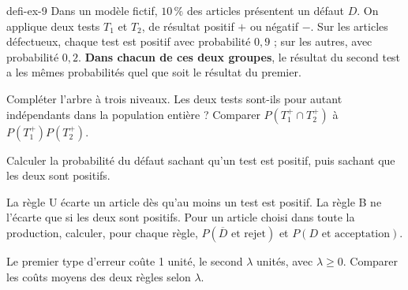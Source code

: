 \begin{blocEdition}{defi-ex-9}
Dans un modèle fictif, $10\,\%$ des articles présentent un défaut $D$.
On applique deux tests $T_1$ et $T_2$, de résultat positif $+$ ou négatif $-$.
Sur les articles défectueux, chaque test est positif avec probabilité $0{,}9$ ;
sur les autres, avec probabilité $0{,}2$.
\textbf{Dans chacun de ces deux groupes}, le résultat du second test a les mêmes
probabilités quel que soit le résultat du premier.
\begin{questions}
\item Compléter l'arbre à trois niveaux. Les deux tests sont-ils pour autant
indépendants dans la population entière ? Comparer $P(T_1^+\cap T_2^+)$ à $P(T_1^+)P(T_2^+)$.
\item Calculer la probabilité du défaut sachant qu'un test est positif,
puis sachant que les deux sont positifs.
\item La règle U écarte un article dès qu'au moins un test est positif.
La règle B ne l'écarte que si les deux sont positifs. Pour un article choisi dans toute la production,
calculer, pour chaque règle, $P(\overline D\text{ et rejet})$ et $P(D\text{ et acceptation})$.
\item Le premier type d'erreur coûte 1 unité, le second $\lambda$ unités, avec $\lambda\geq0$.
Comparer les coûts moyens des deux règles selon $\lambda$.
\end{questions}
\label{figedition-defi-ex-9-1}
\end{blocEdition}

